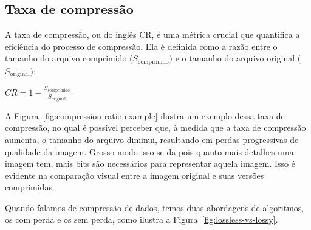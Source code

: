 \subsection{Taxa de compressão}
A taxa de compressão, ou do inglês \acrfull{CR}, é uma métrica crucial que quantifica a eficiência do processo de compressão. Ela é definida como a razão entre o tamanho do arquivo comprimido (\(S_{\text{comprimido}})\) e o tamanho do arquivo original (\(S_{\text{original}})\):
\begin{center}
    \(\displaystyle CR = 1 - \frac{S_{\text{comprimido}}}{S_{\text{original}}}\)
\end{center} 

\noindent A Figura~\ref{fig:compression-ratio-example} ilustra um exemplo dessa taxa de compressão, no qual é possível perceber que, à medida que a taxa de compressão aumenta, o tamanho do arquivo diminui, resultando em perdas progressivas de qualidade da imagem. Grosso modo isso se da pois quanto mais detalhes uma imagem tem, mais bits são necessários para representar aquela imagem. Isso é evidente na comparação visual entre a imagem original e suas versões comprimidas.

\begin{figure}[!htbp]
	\centering
\end{figure}
Quando falamos de compressão de dados, temos duas abordagens de algoritmos, os com perda e os sem perda, como ilustra a Figura~\ref{fig:lossless-vs-lossy}.

